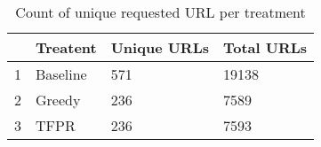 \begin{table}[ht]
\centering
\begin{tabular}{rlll}
  \hline
 & Treatent & Unique URLs & Total URLs \\ 
  \hline
1 & Baseline & 571 & 19138 \\ 
  2 & Greedy & 236 & 7589 \\ 
  3 & TFPR & 236 & 7593 \\ 
   \hline
\end{tabular}
\caption{Count of unique requested URL per treatment} 
\label{tab:results:rq2:summary:treatment:url}
\end{table}
